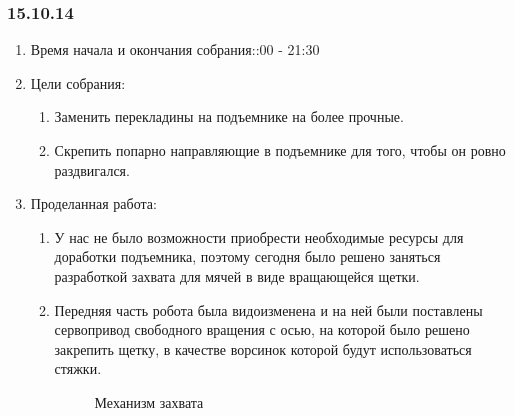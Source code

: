 
\subsubsection{15.10.14}

\begin{enumerate}
	\item Время начала и окончания собрания::00 - 21:30
	\item Цели собрания:\newline
	\begin{enumerate}
	  \item Заменить перекладины на подъемнике на более прочные.\newline
	  
	  \item Скрепить попарно направляющие в подъемнике для того, чтобы он ровно раздвигался.\newline
	  
    \end{enumerate}
    
	\item Проделанная работа:\newline
	\begin{enumerate}
	  \item У нас не было возможности приобрести необходимые ресурсы для доработки подъемника, поэтому сегодня было решено заняться разработкой захвата для мячей в виде вращающейся щетки.\newline
      
      \item  Передняя часть робота была видоизменена и на ней были поставлены сервопривод свободного вращения с осью, на которой было решено закрепить щетку, в качестве ворсинок которой будут использоваться стяжки.\newline
      
     \begin{figure}[H]
     	\begin{minipage}[h]{1\linewidth}
     		\caption{Механизм захвата}
     	\end{minipage}
     \end{figure}
      

\end{enumerate}
\end{enumerate}
